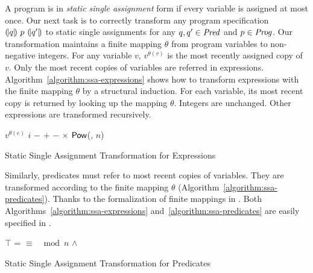 
A program is in \emph{static single assignment} form if every variable
is assigned at most once.  
Our next task is to correctly transform any
program specification ${(\!|}{q}{|\!)}~{p}~{(\!|}{q'}{|\!)}$ to static single 
assignments for any $q, q' \in \mathit{Pred}$ and $p \in \mathit{Prog}$. Our transformation
maintains a finite mapping $\theta$ from program variables to
non-negative integers. For any variable $v$, $v^{\theta(v)}$ is
the most recently assigned copy of $v$. Only the most recent copies of
variables are referred in
expressions. Algorithm~\ref{algorithm:ssa-expressions} shows how 
to transform expressions with the finite mapping $\theta$ by a
structural induction. For each variable, its most recent copy is
returned by looking up the mapping $\theta$. Integers are
unchanged. Other expressions are transformed recursively.

\begin{algorithm}
  \begin{algorithmic}[1]
       \Return $v^{\theta(e)}$ \EndCase
       \Return $i$ \EndCase
       \Return $-$ \EndCase
        \Return {} $+$ 
      \EndCase
        \Return {} $-$ 
      \EndCase
        \Return {} $\times$ 
      \EndCase
        \Return $\mbox{\textsf{Pow}}$(, $n$)
      \EndCase
    \EndMatch
    \EndFunction
  \end{algorithmic}
  \caption{Static Single Assignment Transformation for Expressions}
  \label{algorithm:ssa-expressions}
\end{algorithm}

Similarly, predicates must refer to most recent copies of 
variables. They are transformed according to the finite mapping
$\theta$ (Algorithm~\ref{algorithm:ssa-predicates}). Thanks to the
formalization of finite mappings in \coq. Both
Algorithms~\ref{algorithm:ssa-expressions}
and~\ref{algorithm:ssa-predicates} are easily specified in \gallina.

\begin{algorithm}
  \begin{algorithmic}[1]
      \Case{$\top$} \Return $\top$ \EndCase
        \Return {} = 
      \EndCase
        \Return {} $\equiv$ 
                 $\mod n$
      \EndCase
        \Return {} $\wedge$
      \EndCase
    \EndMatch
    \EndFunction
  \end{algorithmic}
  \caption{Static Single Assignment Transformation for Predicates}
  \label{algorithm:ssa-predicates}
\end{algorithm}

